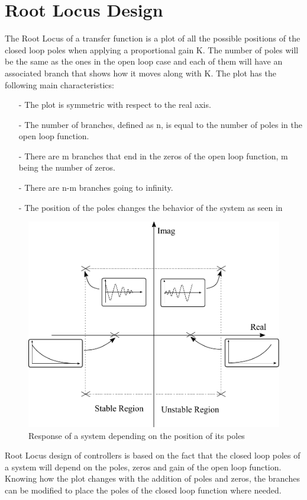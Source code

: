 \section{Root Locus Design}\label{rLocus}
The Root Locus of a transfer function is a plot of all the possible positions of the closed loop poles when applying a proportional gain K. The number of poles will be the same as the ones in the open loop case and each of them will have an associated branch that shows how it moves along with K. The plot has the following main characteristics:
%
\begin{itemize}
	\item[-] The plot is symmetric with respect to the real axis.
	\item[-] The number of branches, defined as n, is equal to the number of poles in the open loop function.
	\item[-] There are m branches that end in the zeros of the open loop function, m being the number of zeros.
	\item[-] There are n-m branches going to infinity.
	\item[-] The position of the poles changes the behavior of the system as seen in 
\end{itemize}
%
\begin{figure}[H] 
	\centering 
	\includegraphics[scale=0.55]{figures/rLocusStability}	
	\caption{Response of a system depending on the position of its poles}
	\label{rLocusStability}
\end{figure}
%
Root Locus design of controllers is based on the fact that the closed loop poles of a system will depend on the poles, zeros and gain of the open loop function. Knowing how the plot changes with the addition of poles and zeros, the branches can be modified to place the poles of the closed loop function where needed.
